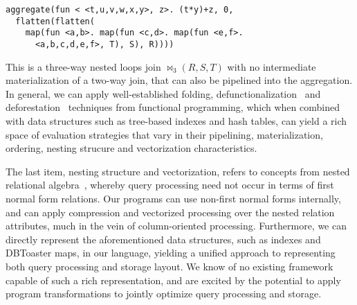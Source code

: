 \begin{verbatim}
aggregate(fun < <t,u,v,w,x,y>, z>. (t*y)+z, 0,
  flatten(flatten(
    map(fun <a,b>. map(fun <c,d>. map(fun <e,f>.
      <a,b,c,d,e,f>, T), S), R))))
\end{verbatim}

This is a three-way nested loops join $\bowtie_3(R,S,T)$ with no intermediate
materialization of a two-way join, that can also be pipelined into the
aggregation. In general, we can apply well-established folding,
defunctionalization~\cite{danvy-ppdp:01} and deforestation~\cite{marlow-fp:92}
techniques from functional programming, which when combined with data structures
such as tree-based indexes and hash tables, can yield a rich space of evaluation
strategies that vary in their pipelining, materialization, ordering, nesting
strucure and vectorization characteristics.

The last item, nesting structure and vectorization, refers to concepts from
nested relational algebra~\cite{schek-infsys:86}, whereby query processing need
not occur in terms of first normal form relations. Our programs can use
non-first normal forms internally, and can apply compression and vectorized
processing over the nested relation attributes, much in the vein of
column-oriented processing. Furthermore, we can directly represent the
aforementioned data structures, such as indexes and DBToaster maps, in our
language, yielding a unified approach to representing both query processing and
storage layout. We know of no existing framework capable of such a rich
representation, and are excited by the potential to apply program
transformations to jointly optimize query processing and storage.


